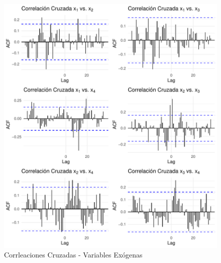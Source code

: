 \documentclass[12pt,oneside]{book}\usepackage[]{graphicx}\usepackage[]{color}
\makeatletter
\def\maxwidth{ %
  \ifdim\Gin@nat@width>\linewidth
    \linewidth
  \else
    \Gin@nat@width
  \fi
}
\newenvironment{knitrout}{}{} %
\theoremstyle{definition} %
\makeatother
\begin{document}






\begin{knitrout}
\color{fgcolor}\begin{figure}[H]

{\centering \includegraphics[width=\maxwidth]{figure/unnamed-chunk-33-1} 

}

\caption{\label{fig:cc_exogenas} Corrleaciones Cruzadas - Variables Exógenas}\label{fig:unnamed-chunk-33}
\end{figure}


\end{knitrout}
\end{document}
